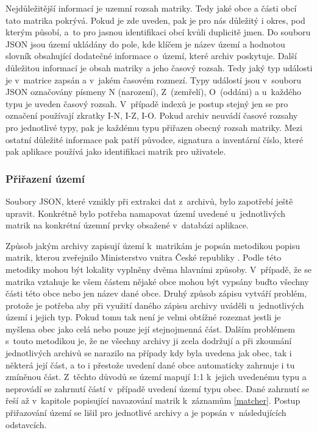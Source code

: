 Nejdůležitější informací je uzemní rozsah matriky. Tedy jaké obce a části obcí tato matrika pokrývá. Pokud je zde uveden, pak je pro nás důležitý i okres, pod kterým působí, a~to pro jasnou identifikaci obcí kvůli duplicitě jmen. Do souboru JSON jsou území ukládány do pole, kde klíčem je název území a hodnotou slovník obsahující dodatečné informace o~území, které archiv poskytuje. Další důležitou informací je obsah matriky a jeho časový rozsah. Tedy jaký typ události je v~matrice zapsán a v~jakém časovém rozmezí. Typy událostí jsou v~souboru JSON označovány písmeny N (narození), Z~(zemřelí), O~(oddáni) a u~každého typu je uveden časový rozsah. V~případě indexů je postup stejný jen se pro označení používají zkratky I-N, I-Z, I-O. Pokud archiv neuvádí časové rozsahy pro jednotlivé typy, pak je každému typu přiřazen obecný rozsah matriky. Mezi ostatní důležité informace pak patří původce, signatura a inventární číslo, které pak aplikace používá jako identifikaci matrik pro uživatele.

\subsubsection{Přiřazení území}
\label{uzemi_assign}
Soubory JSON, které vznikly při extrakci dat z~archivů, bylo zapotřebí ještě upravit. Konkrétně bylo potřeba namapovat území uvedené u~jednotlivých matrik na konkrétní územní prvky obsažené v~databázi aplikace. 

Způsob jakým archivy zapisují území k~matrikám je popsán metodikou popisu matrik, kterou zveřejnilo Ministerstvo vnitra České republiky \cite{metodika}. Podle této metodiky mohou být lokality vyplněny dvěma hlavními způsoby. V~případě, že se matrika vztahuje ke všem částem nějaké obce mohou být vypsány buďto všechny části této obce nebo jen název dané obce. Druhý způsob zápisu vytváří problém, protože je potřeba aby při využití daného zápisu archivy uváděli u~jednotlivých území i jejich typ. Pokud tomu tak není je velmi obtížné rozeznat jestli je myšlena obec jako celá nebo pouze její stejnojmenná část. Dalším problémem s~touto metodikou je, že ne všechny archivy ji zcela dodržují a při zkoumání jednotlivých archivů se narazilo na případy kdy byla uvedena jak obec, tak i některá její část, a to i přestože uvedení dané obce automaticky zahrnuje i tu zmíněnou část. Z~těchto důvodů se území mapují 1:1 k~jejich uvedenému typu a neprovádí se zahrnutí částí v~případě uvedení území typu obec. Dané zahrnutí se řeší až v~kapitole popisující navazování matrik k~záznamům \ref{matcher}. Postup přiřazování území se lišil pro jednotlivé archivy a je popsán v~následujících odstavcích.

